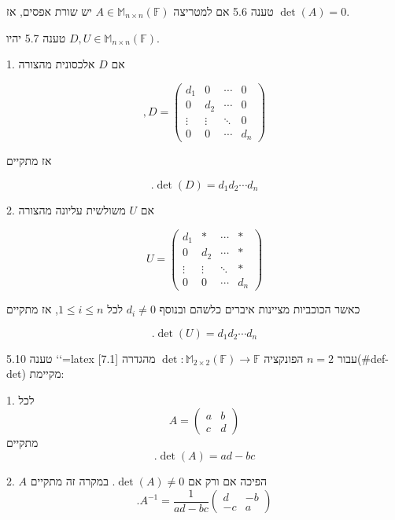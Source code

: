 \documentclass[a4paper, 11pt]{article}
\begin{document}
\begin{envbox}[thmcolor]{טענה 5.6}
אם למטריצה $A\in\mathbb{M}_{n\times n}(\mathbb{F})$ יש שורת אפסים, אז $\det(A)=0$.
\end{envbox}

\begin{envbox}[thmcolor]{טענה 5.7}
יהיו $D,U\in\mathbb{M}_{n\times n}(\mathbb{F})$.

1.  אם $D$ אלכסונית מהצורה

    
\[
,D=\begin{pmatrix}
    d_1 &0 & \cdots & 0 \\
    0 & d_2 & \cdots & 0 \\
    \vdots & \vdots & \ddots & 0 \\
    0 & 0 & \cdots & d_n
    \end{pmatrix}
\]

    אז מתקיים

    
\[
.\det(D)=d_1d_2\cdots d_n
\]

2.  אם $U$ משולשית עליונה מהצורה

    
\[
U=\begin{pmatrix}
    d_1 &* & \cdots & * \\
    0 & d_2 & \cdots & * \\
    \vdots & \vdots & \ddots & * \\
    0 & 0 & \cdots & d_n
    \end{pmatrix}
\]

    כאשר הכוכביות מציינות איברים כלשהם ובנוסף $d_i\neq 0$ לכל $1\leq i\leq n$, אז מתקיים

    
\[
.\det(U)=d_1d_2\cdots d_n
\]
\end{envbox}

\begin{envbox}[thmcolor]{טענה 5.10}
`\label{prop:det-order-2}`{=latex} עבור $n=2$ הפונקציה $\det:\mathbb{M}_{2\times 2}(\mathbb{F})\to\mathbb{F}$ מהגדרה [7.1](\#def-det) מקיימת:

1.  לכל 
\[
A=\begin{pmatrix}
    a & b \\
    c & d
    \end{pmatrix}
\]
 מתקיים 
\[
.\det(A)=ad-bc
\]

2.  $A$ הפיכה אם ורק אם $\det(A)\neq 0$. במקרה זה מתקיים 
\[
.A^{-1}=\frac{1}{ad-bc}\begin{pmatrix}
    d & -b \\
    -c & a
    \end{pmatrix}
\]
\end{envbox}
\end{document}
